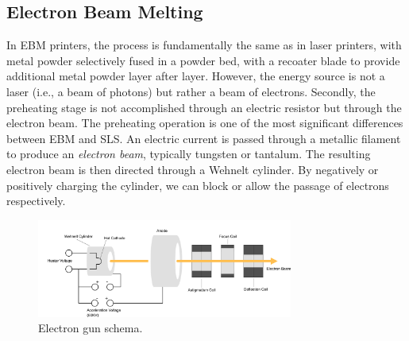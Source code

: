 \subsection{Electron Beam Melting}
\label{subsec:ebm}
In EBM printers, the process is fundamentally the same as in laser printers, with metal powder selectively fused in a powder bed, with a recoater blade to provide additional metal powder layer after layer. However, the energy source is not a laser (i.e., a beam of photons) but rather a beam of electrons. Secondly, the preheating stage is not accomplished through an electric resistor but through the electron beam. The preheating operation is one of the most significant differences between EBM and SLS. An electric current is passed through a metallic filament to produce an \emph{electron beam}, typically tungsten or tantalum. The resulting electron beam is then directed through a Wehnelt cylinder. By negatively or positively charging the cylinder, we can block or allow the passage of electrons respectively.
\begin{figure}
    \centering
    \includegraphics[width=0.75\textwidth]{Images/EBM.png}
    \caption[Electron gun schema.]{Electron gun schema.}
    \label{fig:electrongun}
\end{figure}
